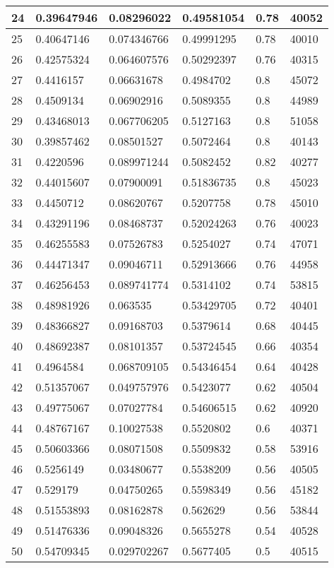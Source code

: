 \begin{longtable}{|l|l|l|l|l|l|}
24 & 0.39647946 & 0.08296022 & 0.49581054 & 0.78 & 40052 \\ \hline 
25 & 0.40647146 & 0.074346766 & 0.49991295 & 0.78 & 40010 \\ \hline 
26 & 0.42575324 & 0.064607576 & 0.50292397 & 0.76 & 40315 \\ \hline 
27 & 0.4416157 & 0.06631678 & 0.4984702 & 0.8 & 45072 \\ \hline 
28 & 0.4509134 & 0.06902916 & 0.5089355 & 0.8 & 44989 \\ \hline 
29 & 0.43468013 & 0.067706205 & 0.5127163 & 0.8 & 51058 \\ \hline 
30 & 0.39857462 & 0.08501527 & 0.5072464 & 0.8 & 40143 \\ \hline 
31 & 0.4220596 & 0.089971244 & 0.5082452 & 0.82 & 40277 \\ \hline 
32 & 0.44015607 & 0.07900091 & 0.51836735 & 0.8 & 45023 \\ \hline 
33 & 0.4450712 & 0.08620767 & 0.5207758 & 0.78 & 45010 \\ \hline 
34 & 0.43291196 & 0.08468737 & 0.52024263 & 0.76 & 40023 \\ \hline 
35 & 0.46255583 & 0.07526783 & 0.5254027 & 0.74 & 47071 \\ \hline 
36 & 0.44471347 & 0.09046711 & 0.52913666 & 0.76 & 44958 \\ \hline 
37 & 0.46256453 & 0.089741774 & 0.5314102 & 0.74 & 53815 \\ \hline 
38 & 0.48981926 & 0.063535 & 0.53429705 & 0.72 & 40401 \\ \hline 
39 & 0.48366827 & 0.09168703 & 0.5379614 & 0.68 & 40445 \\ \hline 
40 & 0.48692387 & 0.08101357 & 0.53724545 & 0.66 & 40354 \\ \hline 
41 & 0.4964584 & 0.068709105 & 0.54346454 & 0.64 & 40428 \\ \hline 
42 & 0.51357067 & 0.049757976 & 0.5423077 & 0.62 & 40504 \\ \hline 
43 & 0.49775067 & 0.07027784 & 0.54606515 & 0.62 & 40920 \\ \hline 
44 & 0.48767167 & 0.10027538 & 0.5520802 & 0.6 & 40371 \\ \hline 
45 & 0.50603366 & 0.08071508 & 0.5509832 & 0.58 & 53916 \\ \hline 
46 & 0.5256149 & 0.03480677 & 0.5538209 & 0.56 & 40505 \\ \hline 
47 & 0.529179 & 0.04750265 & 0.5598349 & 0.56 & 45182 \\ \hline 
48 & 0.51553893 & 0.08162878 & 0.562629 & 0.56 & 53844 \\ \hline 
49 & 0.51476336 & 0.09048326 & 0.5655278 & 0.54 & 40528 \\ \hline 
50 & 0.54709345 & 0.029702267 & 0.5677405 & 0.5 & 40515 \\ \hline 
\end{longtable}